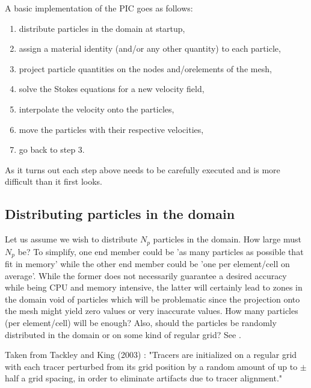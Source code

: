 A basic implementation of the PIC goes as follows:
\begin{enumerate}
\item distribute particles in the domain at startup,
\item assign a material identity (and/or any other quantity) to each particle,
\item project particle quantities on the  nodes and/orelements of the mesh,
\item solve the Stokes equations for a new velocity field,
\item interpolate the velocity onto the particles,
\item move the particles with their respective velocities, 
\item go back to step 3.
\end{enumerate}  

As it turns out each step above needs to be carefully executed and is more difficult 
than it first looks. 

\subsection{Distributing particles in the domain} 
Let us assume we wish to distribute $N_p$ particles
in the domain. How large must $N_p$ be? To simplify, one end member could be 'as many particles as possible that fit in memory' 
while the other end member could be 'one per element/cell on average'. While the former does not necessarily guarantee a 
desired accuracy while being CPU and memory intensive, the latter will certainly lead to zones in the domain void 
of particles which will be problematic since the projection onto the mesh might yield zero values or very inaccurate values.
How many particles (per element/cell) will be enough?
Also, should the particles be randomly distributed in the domain or on some kind of regular grid? 
See .

Taken from Tackley and King (2003) \cite{taki03}: "Tracers are initialized on a regular grid 
with each tracer perturbed from its grid position by a random amount of up to
$\pm$ half a grid spacing, in order to eliminate artifacts due to tracer alignment."


